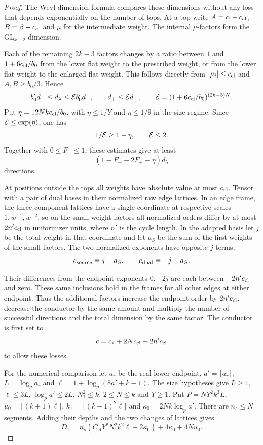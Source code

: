 \begin{proof}
The Weyl dimension formula compares these dimensions without
any loss that depends exponentially on the number of tops.
At a top write \(A=\alpha-c_{\rm cl}\), \(B=\beta-c_{\rm cl}\)
and \(\mu\) for the intermediate weight.
The internal \(\mu\)-factors form the \(\mathrm{GL}_{k-2}\)
dimension.

Each of the remaining \(2k-3\) factors changes by a
ratio between \(1\) and \(1+6c_{\rm cl}/b_0\) from the lower
flat weight to the prescribed weight, or from the lower flat
weight to the enlarged flat weight. This follows directly from
\(|\mu_i|\le c_{\rm cl}\) and \(A,B\ge b_0/3\). Hence
\[
 b_0' d_-\le d_\lambda\le {\cal E}b_0'd_-,
 \qquad d_+\le{\cal E}d_-,\qquad
 {\cal E}=(1+6c_{\rm cl}/b_0)^{(2k-3)N}.
\]
Put \(\eta=12Nk c_{\rm cl}/b_0\), with \(\eta\le1/Y\)
and \(\eta\le1/9\) in the size regime. Since
\({\cal E}\le\exp(\eta)\), one has \[
 1/{\cal E}\ge1-\eta,\qquad {\cal E}\le2.
\] Together with \(0\le F_-\le1\),
these estimates give at least
\[
 (1-F_--2F_+-\eta)d_\lambda
\]
directions.

At positions outside the tops all weights have absolute value
at most \(c_{\rm cl}\). Tensor with a pair of dual bases
in their normalized raw edge lattices. In an edge frame, the
three component lattices have a single coordinate at respective
scales \(1,w^{-1},w^{-2}\), so on the small-weight factors all
normalized orders differ by at most \(2n'c_{\rm cl}\) in
uniformizer units, where \(n'\) is the cycle length. In the
adapted basis let \(j\) be the total weight in that coordinate
and let \(a_S\) be the sum of the first weights of the small
factors. The two normalized exponents have opposite \(j\)-terms,
\[
 e_{\rm source}=j-a_S,\qquad e_{\rm dual}=-j-a_S.
\]

Their differences from the endpoint exponents \(0,-2j\)
are each between \(-2n'c_{\rm cl}\) and zero.
These same inclusions hold in the frames for all other
edges at either endpoint.
Thus the additional factors increase the endpoint order by
\(2n'c_{\rm cl}\), decrease the conductor by the same amount
and multiply the number of successful directions and the
total dimension by the same factor.
The conductor is first set to
\[
 c=c_*+2Nc_{\rm cl}+2n'c_{\rm cl}
\]
to allow these losses.

For the numerical comparison let \(a_r\) be the real lower
endpoint, \(a'=\lceil a_r\rceil\), \(L=\log_p a_r\) and
\(\ell=1+\log_p(8a'+k-1)\). The size hypotheses give
\(L\ge1\), \(\ell\le3L\), \(\log_p a'\le2L\), \(N_1^2\le k\),
\(2\le N\le k\) and \(Y\ge1\). Put \(P=NY^2k^3L\),
\(u_0=\lceil(k+1)\ell\rceil\), \(k_1=\lceil(k-1)^2\ell\rceil\)
and \(\kappa_0=2Nk\log_p a'\). There are \(n_s\le N\) segments.
Adding their depths and the two changes of lattices gives
\[
 D_1=n_s(C_A Y^2 N_1^2k^2\ell+2\kappa_0)+4\kappa_0+4Nu_0.
\]


\end{proof}
